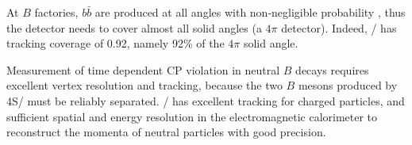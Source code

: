 At $B$ factories, $b \bar{b}$ are produced at all angles with
non-negligible probability \cite{Boutigny:1995ib,McGregor:2008ek}, thus the
detector needs to cover almost all solid angles (a $4\pi$ detector).
Indeed, \BaBar/ has tracking coverage of 0.92, namely 92\% of the $4\pi$ solid
angle.

Measurement of time dependent CP violation in neutral $B$ decays requires
excellent vertex resolution and tracking, because the two $B$ mesons produced by
\Y4S/ must be reliably separated.
\BaBar/ has excellent tracking for charged particles, and sufficient spatial
and energy resolution in the electromagnetic calorimeter to reconstruct the
momenta of neutral particles \cite{Bauer:2005} with good precision.
